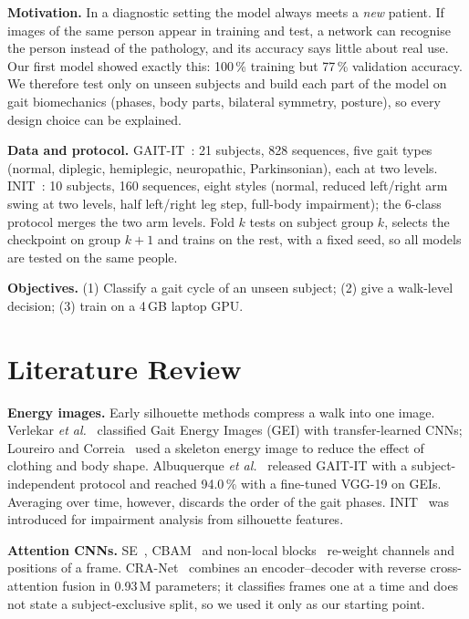 \documentclass[conference]{IEEEtran}
\begin{document}
\textbf{Motivation.} In a diagnostic setting the model always meets a
\emph{new} patient. If images of the same person appear in training and test,
a network can recognise the person instead of the pathology, and its accuracy
says little about real use. Our first model showed exactly this: 100\,\%
training but 77\,\% validation accuracy. We therefore test only on unseen
subjects and build each part of the model on gait biomechanics (phases, body
parts, bilateral symmetry, posture), so every design choice can be explained.

\textbf{Data and protocol.} GAIT-IT~\cite{albuquerque2021}: 21 subjects, 828
sequences, five gait types (normal, diplegic, hemiplegic, neuropathic,
Parkinsonian), each at two levels. INIT~\cite{ortells2018}: 10 subjects, 160
sequences, eight styles (normal, reduced left/right arm swing at two levels,
half left/right leg step, full-body impairment); the 6-class protocol merges
the two arm levels. Fold $k$ tests on subject group $k$, selects the checkpoint
on group $k{+}1$ and trains on the rest, with a fixed seed, so all models are
tested on the same people.

\textbf{Objectives.} (1) Classify a gait cycle of an unseen subject; (2) give a
walk-level decision; (3) train on a 4\,GB laptop GPU.

\section{Literature Review}
\textbf{Energy images.} Early silhouette methods compress a walk into one image.
Verlekar \emph{et al.}~\cite{verlekar2018} classified Gait Energy Images (GEI)
with transfer-learned CNNs; Loureiro and Correia~\cite{loureiro2020} used a
skeleton energy image to reduce the effect of clothing and body shape.
Albuquerque \emph{et al.}~\cite{albuquerque2021} released GAIT-IT with a
subject-independent protocol and reached 94.0\,\% with a fine-tuned VGG-19 on
GEIs. Averaging over time, however, discards the order of the gait phases.
INIT~\cite{ortells2018} was introduced for impairment analysis from silhouette
features.

\textbf{Attention CNNs.} SE~\cite{hu2018se}, CBAM~\cite{woo2018cbam} and
non-local blocks~\cite{wang2018nonlocal} re-weight channels and positions of a
frame. CRA-Net~\cite{bodepu_cranet} combines an encoder--decoder with reverse
cross-attention fusion in 0.93\,M parameters; it classifies frames one at a
time and does not state a subject-exclusive split, so we used it only as our
starting point.
\end{document}
